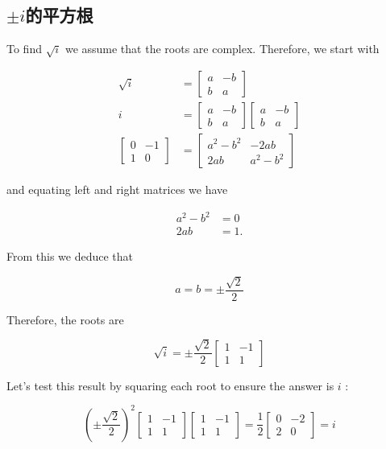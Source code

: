 \subsection{\boldmath $\pm i$的平方根}
To find $\sqrt{i}$ we assume that the roots are complex. Therefore, we start with

$$
\begin{aligned}
\sqrt{i} & =\left[\begin{array}{cc}
a & -b \\
b & a
\end{array}\right] \\
i & =\left[\begin{array}{cc}
a & -b \\
b & a
\end{array}\right]\left[\begin{array}{cc}
a & -b \\
b & a
\end{array}\right] \\
{\left[\begin{array}{cc}
0 & -1 \\
1 & 0
\end{array}\right] } & =\left[\begin{array}{cc}
a^{2}-b^{2} & -2 a b \\
2 a b & a^{2}-b^{2}
\end{array}\right]
\end{aligned}
$$

and equating left and right matrices we have

$$
\begin{aligned}
a^{2}-b^{2} & =0 \\
2 a b & =1 .
\end{aligned}
$$

From this we deduce that

$$
a=b= \pm \frac{\sqrt{2}}{2}
$$

Therefore, the roots are

$$
\sqrt{i}= \pm \frac{\sqrt{2}}{2}\left[\begin{array}{cc}
1 & -1 \\
1 & 1
\end{array}\right]
$$

Let's test this result by squaring each root to ensure the answer is $i$ :

$$
\left( \pm \frac{\sqrt{2}}{2}\right)^{2}\left[\begin{array}{cc}
1 & -1 \\
1 & 1
\end{array}\right]\left[\begin{array}{cc}
1 & -1 \\
1 & 1
\end{array}\right]=\frac{1}{2}\left[\begin{array}{cc}
0 & -2 \\
2 & 0
\end{array}\right]=i
$$

